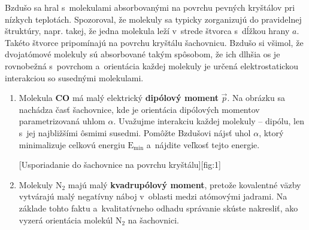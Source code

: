 Bzdušo sa hral s~molekulami absorbovanými na povrchu pevných kryštálov pri nízkych teplotách.
Spozoroval, že molekuly sa typicky zorganizujú do pravidelnej štruktúry, napr. takej,
že jedna molekula leží v~strede štvorca s~dĺžkou hrany $a$.
Takéto štvorce pripomínajú na povrchu kryštálu šachovnicu.
Bzdušo si všimol, že dvojatómové molekuly sú absorbované takým spôsobom,
že ich dlhšia os je rovnobežná s~povrchom a~orientácia každej molekuly je
určená elektrostatickou interakciou so susednými molekulami.

\begin{enumerate}
	\item Molekula \textbf{CO} má malý elektrický \textbf{dipólový moment} $\vec{p}$.
		Na obrázku sa nachádza časť šachovnice, kde je orientácia dipólových momentov parametrizovaná uhlom $\alpha$.
		Uvažujme interakciu každej molekuly -- dipólu, len s~jej najbližšími ôsmimi susedmi.
		Pomôžte Bzdušovi nájsť uhol $\alpha$, ktorý minimalizuje celkovú energiu $\mathrm{E}_\text{min}$
		a~nájdite veľkosť tejto energie.
		
		[Usporiadanie do šachovnice na povrchu kryštálu][fig:1]

	\item Molekuly $\text{N}_2$ majú malý \textbf{kvadrupólový moment}, pretože kovalentné väzby vytvárajú
		malý negatívny náboj v~oblasti medzi atómovými jadrami. Na základe tohto faktu a~kvalitatívneho odhadu
		správanie skúste nakresliť, ako vyzerá orientácia molekúl $\text{N}_2$ na šachovnici.
\end{enumerate}

